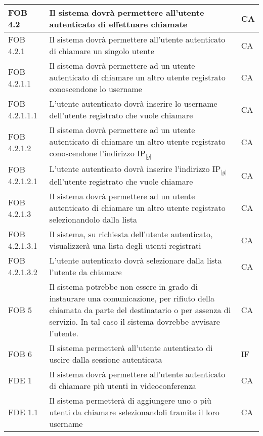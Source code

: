\begin{longtable}{p{} p{} p{} }
\midrule
FOB 4.2 & Il sistema dovrà permettere all'utente autenticato di effettuare chiamate & CA\\

\midrule
FOB 4.2.1 & Il sistema dovrà permettere all'utente autenticato di chiamare un singolo utente & CA\\

\midrule
FOB 4.2.1.1 & Il sistema dovrà permettere ad un utente autenticato di chiamare un altro utente registrato conoscendone lo username & CA\\
\midrule
FOB 4.2.1.1.1 & L'utente autenticato dovrà inserire lo username dell'utente registrato che vuole chiamare & CA\\

\midrule
FOB 4.2.1.2 & Il sistema dovrà permettere ad un utente autenticato di chiamare un altro utente registrato conoscendone l'indirizzo IP$_{|g|}$ & CA\\
\midrule
FOB 4.2.1.2.1 & L'utente autenticato dovrà inserire l'indirizzo IP$_{|g|}$ dell'utente registrato che vuole chiamare & CA\\

\midrule
FOB 4.2.1.3 & Il sistema dovrà permettere ad un utente autenticato di chiamare un altro utente registrato selezionandolo dalla lista & CA\\
\midrule
FOB 4.2.1.3.1 & Il sistema, su richiesta dell'utente autenticato, visualizzerà una lista degli utenti registrati & CA\\
\midrule
FOB 4.2.1.3.2 & L'utente autenticato dovrà selezionare dalla lista l'utente da chiamare & CA\\

\midrule
FOB 5 & Il sistema potrebbe non essere in grado di instaurare una comunicazione, per rifiuto della chiamata da parte del destinatario o per assenza di servizio. In tal caso il sistema dovrebbe avvisare l'utente. & CA\\

\midrule
FOB 6 & Il sistema permetterà all'utente autenticato di uscire dalla sessione autenticata & IF\\

\midrule
FDE 1 & Il sistema dovrà permettere all'utente autenticato di chiamare più utenti in videoconferenza & CA\\

\midrule
FDE 1.1 & Il sistema permetterà di aggiungere uno o più utenti da chiamare selezionandoli tramite il loro username & CA\\


\end{longtable}

